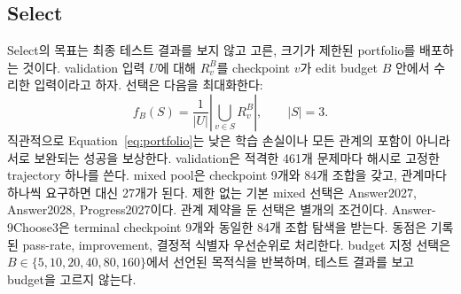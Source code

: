 \documentclass[10pt,conference]{IEEEtran}
\begin{document}
\subsection{Select}
Select의 목표는 최종 테스트 결과를 보지 않고 고른, 크기가 제한된 portfolio를 배포하는 것이다. validation 입력 \(U\)에 대해 \(R_v^B\)를 checkpoint \(v\)가 edit budget \(B\) 안에서 수리한 입력이라고 하자. 선택은 다음을 최대화한다:
\begin{equation}
 f_B(S)=\frac{1}{|U|}\left|\bigcup_{v\in S} R_v^B\right|,\qquad |S|=3.
\label{eq:portfolio}
\end{equation}
직관적으로 Equation~\eqref{eq:portfolio}는 낮은 학습 손실이나 모든 관계의 포함이 아니라 서로 보완되는 성공을 보상한다. validation은 적격한 461개 문제마다 해시로 고정한 trajectory 하나를 쓴다. mixed pool은 checkpoint 9개와 84개 조합을 갖고, 관계마다 하나씩 요구하면 대신 27개가 된다. 제한 없는 기본 mixed 선택은 Answer2027, Answer2028, Progress2027이다. 관계 제약을 둔 선택은 별개의 조건이다. Answer-9Choose3은 terminal checkpoint 9개와 동일한 84개 조합 탐색을 받는다. 동점은 기록된 pass-rate, improvement, 결정적 식별자 우선순위로 처리한다. budget 지정 선택은 \(B\in\{5,10,20,40,80,160\}\)에서 선언된 목적식을 반복하며, 테스트 결과를 보고 budget을 고르지 않는다.
\end{document}
